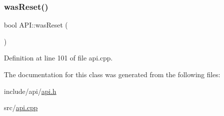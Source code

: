 \mbox{\label{class_a_p_i_ab754e11300491d9efee2da2eda368d93}} 
\subsubsection{\texorpdfstring{was\+Reset()}{wasReset()}}
{\footnotesize\ttfamily bool A\+P\+I\+::was\+Reset (\begin{DoxyParamCaption}{ }\end{DoxyParamCaption})\hspace{0.3cm}{\ttfamily [static]}}



Definition at line 101 of file api.\+cpp.



The documentation for this class was generated from the following files\+:\begin{DoxyCompactItemize}
\item 
include/api/\hyperlink{api_8h}{api.\+h}\item 
src/\hyperlink{api_8cpp}{api.\+cpp}\end{DoxyCompactItemize}
